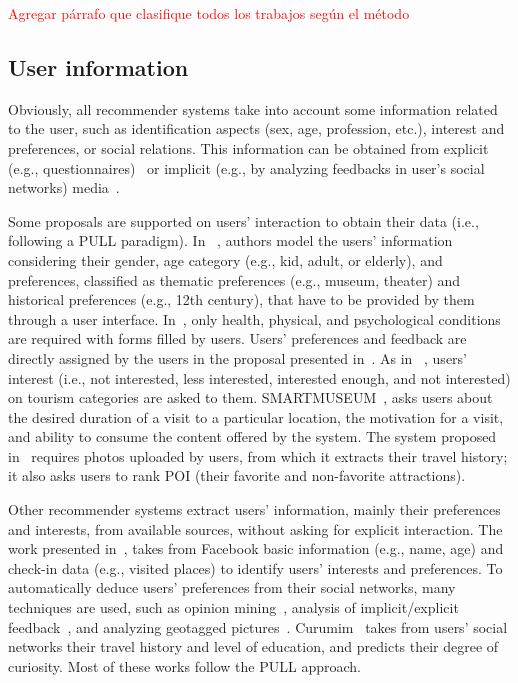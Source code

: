 \textcolor{red}{Agregar párrafo que clasifique todos los trabajos según el método}

\subsection{User information}
Obviously, all recommender systems take into account some information related to the user, such as identification aspects (sex, age, profession, etc.), interest and preferences, or social relations. This information can be obtained from explicit (e.g., questionnaires)~\cite{jannach2020interactive} or implicit (e.g., by analyzing feedbacks in user's social networks) media~\cite{lin2018hybrid}.  

Some proposals are supported on users' interaction to obtain their data (i.e., following a PULL paradigm). In  %
~\cite{rajaonarivo2019rec}, authors model the users' information considering their gender, age category (e.g., kid, adult, or elderly), and preferences, classified as thematic preferences (e.g., museum, theater) and historical preferences (e.g., 12th century), that have to be provided by them through a user interface.  In~\cite{santos2019using}, only health,  physical, and psychological conditions are required  with forms filled by users. 
Users' preferences and feedback are directly assigned by the users in the proposal presented in~\cite{bahramian_abbaspour_claramunt_2017}. As in ~\cite{arigi2018context}, users' interest (i.e., not interested, less interested, interested enough, and not interested) on tourism categories are asked to them. SMARTMUSEUM~\cite{ruotsalo2013smartmuseum}, asks users about the desired duration of a visit to a particular location, the motivation for a visit, and ability to consume the content offered by the system. The system proposed in~\cite{shen2016attraction} requires photos uploaded by users, from which it extracts their travel history; it also asks users to rank  POI (their favorite and non-favorite attractions).
 

Other recommender systems extract users' information, mainly their preferences and interests, from available sources,
without asking for explicit interaction.  The work presented in~\cite{kesorn2017personalized}, takes from Facebook basic information (e.g., name, age) and  check-in data (e.g., visited places)  to identify users' interests and preferences. 
To automatically deduce users' preferences from their social networks, many techniques are used, such as  opinion mining~\cite{logesh2019exploring,logesh2018personalised}, analysis of implicit/explicit feedback~\cite{hidasi2016general}, and analyzing geotagged pictures~\cite{sun2019building}. 
Curumim~\cite{menk2017curumim} takes from users' social networks their travel history and level of education, and predicts their degree of curiosity. Most of these works follow the PULL approach.


